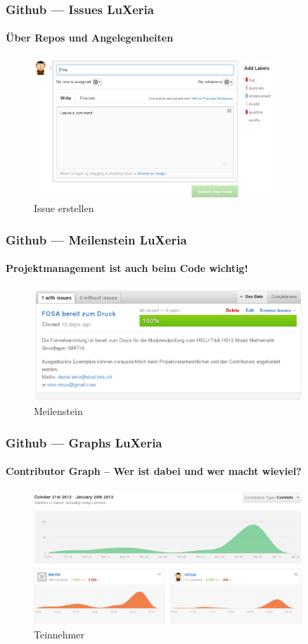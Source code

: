 \begin{frame}
    \frametitle{Github --- Issues \hfill{} LuXeria}
    \framesubtitle{Über Repos und Angelegenheiten}
    \begin{figure}
        \includegraphics[width=0.8\textwidth]{github_issue.pdf}
        \caption{Issue erstellen}
    \end{figure}
\end{frame}

\begin{frame}
    \frametitle{Github --- Meilenstein \hfill{} LuXeria}
    \framesubtitle{Projektmanagement ist auch beim Code wichtig!}
    \begin{figure}
        \includegraphics[width=0.9\textwidth]{github_milestone.pdf}
        \caption{Meilenstein}
    \end{figure}
\end{frame}

\begin{frame}
    \frametitle{Github --- Graphs \hfill{} LuXeria}
    \framesubtitle{Contributor Graph -- Wer ist dabei und wer macht wieviel?}
    \begin{figure}
        \includegraphics[width=0.9\textwidth]{github_contributors.pdf}
        \caption{Teinnehmer}
    \end{figure}
\end{frame}

